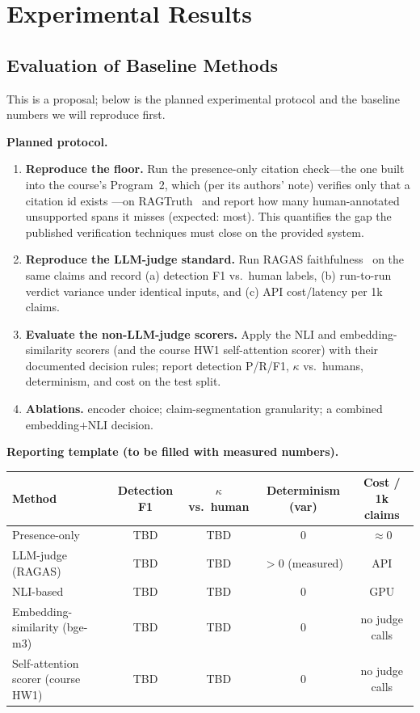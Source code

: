 \section{Experimental Results}
\label{section:exp}
\subsection{Evaluation of Baseline Methods}
\label{section:exp:baseline}

This is a proposal; below is the planned experimental protocol and the baseline numbers
we will reproduce first.

\textbf{Planned protocol.}
\begin{enumerate}
  \item \textbf{Reproduce the floor.} Run the presence-only citation check---the one built
  into the course's Program~2, which (per its authors' note) verifies only that a citation
  id exists \citep{gao2023alce}---on RAGTruth~\citep{niu2024ragtruth} and report how many
  human-annotated unsupported spans it misses (expected: most). This quantifies the gap the
  published verification techniques must close on the provided system.
  \item \textbf{Reproduce the LLM-judge standard.} Run RAGAS faithfulness~\citep{es2024ragas}
  on the same claims and record (a) detection F1 vs.\ human labels, (b) run-to-run verdict
  variance under identical inputs, and (c) API cost/latency per 1k claims.
  \item \textbf{Evaluate the non-LLM-judge scorers.} Apply the NLI and
  embedding-similarity scorers (and the course HW1 self-attention scorer) with their
  documented decision rules; report detection P/R/F1, $\kappa$ vs.\ humans, determinism,
  and cost on the test split.
  \item \textbf{Ablations.} encoder choice; claim-segmentation granularity; a combined
  embedding$+$NLI decision.
\end{enumerate}

\textbf{Reporting template (to be filled with measured numbers).}
\begin{center}
\begin{tabular}{lcccc}
\toprule
Method & Detection F1 & $\kappa$ vs.\ human & Determinism (var) & Cost / 1k claims \\
\midrule
Presence-only \citep{gao2023alce}      & TBD & TBD & $0$ & $\approx 0$ \\
LLM-judge (RAGAS) \citep{es2024ragas}  & TBD & TBD & $>0$ (measured) & API \\
NLI-based \citep{honovich2022true}     & TBD & TBD & $0$ & GPU \\
Embedding-similarity (bge-m3)          & TBD & TBD & $0$ & no judge calls \\
Self-attention scorer (course HW1)     & TBD & TBD & $0$ & no judge calls \\
\bottomrule
\end{tabular}
\end{center}

